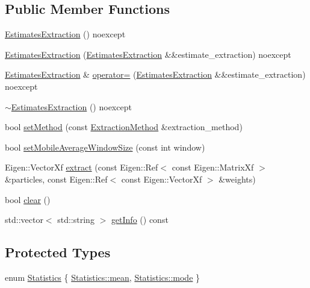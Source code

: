 \subsection*{Public Member Functions}
\begin{DoxyCompactItemize}
\item 
\mbox{\hyperlink{classbfl_1_1EstimatesExtraction_a49ab15a22c1766a16cd6ccc29447dd49}{Estimates\+Extraction}} () noexcept
\item 
\mbox{\hyperlink{classbfl_1_1EstimatesExtraction_a3d16bdd9dbc8841eae07cfdc3aa52114}{Estimates\+Extraction}} (\mbox{\hyperlink{classbfl_1_1EstimatesExtraction}{Estimates\+Extraction}} \&\&estimate\+\_\+extraction) noexcept
\item 
\mbox{\hyperlink{classbfl_1_1EstimatesExtraction}{Estimates\+Extraction}} \& \mbox{\hyperlink{classbfl_1_1EstimatesExtraction_ae473904953c7ad90408da2b4d3c14a1a}{operator=}} (\mbox{\hyperlink{classbfl_1_1EstimatesExtraction}{Estimates\+Extraction}} \&\&estimate\+\_\+extraction) noexcept
\item 
\mbox{\hyperlink{classbfl_1_1EstimatesExtraction_af7a89d920cc8e4ebbef66c1dfce37ecb}{$\sim$\+Estimates\+Extraction}} () noexcept
\item 
bool \mbox{\hyperlink{classbfl_1_1EstimatesExtraction_a68bb4f3b41f578a38d9847b9c140c130}{set\+Method}} (const \mbox{\hyperlink{classbfl_1_1EstimatesExtraction_a8489976af4025f0bbc3288ff7f17ffb0}{Extraction\+Method}} \&extraction\+\_\+method)
\item 
bool \mbox{\hyperlink{classbfl_1_1EstimatesExtraction_a49babb0803c50d697b8d21014010f5bb}{set\+Mobile\+Average\+Window\+Size}} (const int window)
\item 
Eigen\+::\+Vector\+Xf \mbox{\hyperlink{classbfl_1_1EstimatesExtraction_a62d6fe7e504087183ab0b4bb62e214d4}{extract}} (const Eigen\+::\+Ref$<$ const Eigen\+::\+Matrix\+Xf $>$ \&particles, const Eigen\+::\+Ref$<$ const Eigen\+::\+Vector\+Xf $>$ \&weights)
\item 
bool \mbox{\hyperlink{classbfl_1_1EstimatesExtraction_a26c432f43ff0849e54b2e9474c02d1a5}{clear}} ()
\item 
std\+::vector$<$ std\+::string $>$ \mbox{\hyperlink{classbfl_1_1EstimatesExtraction_a522ca7407979007a4199291a756486d6}{get\+Info}} () const
\end{DoxyCompactItemize}
\subsection*{Protected Types}
\begin{DoxyCompactItemize}
\item 
enum \mbox{\hyperlink{classbfl_1_1EstimatesExtraction_a8c0593a43166c569530947107c830462}{Statistics}} \{ \mbox{\hyperlink{classbfl_1_1EstimatesExtraction_a8c0593a43166c569530947107c830462ab93db188572fc4d76cce5660f3823b0a}{Statistics\+::mean}}, 
\mbox{\hyperlink{classbfl_1_1EstimatesExtraction_a8c0593a43166c569530947107c830462a15d61712450a686a7f365adf4fef581f}{Statistics\+::mode}}
 \}
\end{DoxyCompactItemize}

